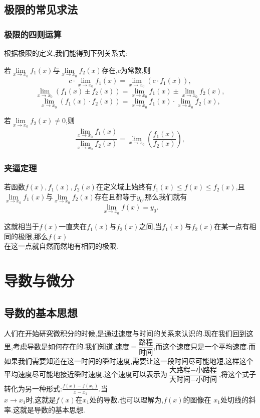 \documentclass{article}
\begin{document}
\subsection{极限的常见求法}
\subsubsection{极限的四则运算}
根据极限的定义,我们能得到下列关系式:
\par 若$\lim\limits_{x\to x_0}f_1(x)$与$\lim\limits_{x\to x_0}f_2(x)$存在,$c$为常数,则
\[c\cdot \lim\limits_{x\to x_0}f_1(x)=\lim\limits_{x\to x_0}\left(c\cdot f_1(x)\right),\]
\[\lim\limits_{x\to x_0}\left(f_1(x)\pm f_2(x) \right)=\lim\limits_{x\to x_0}f_1(x)\pm \lim\limits_{x\to x_0}f_2(x),\]
\[\lim\limits_{x\to x_0}\left(f_1(x)\cdot f_2(x)\right)=\lim\limits_{x\to x_0}f_1(x)\cdot \lim\limits_{x\to x_0}f_2(x),\]
\par 若$\lim\limits_{x\to x_0}f_2(x)\neq 0$,则
\[\frac{\lim\limits_{x\to x_0}f_1(x)}{\lim\limits_{x\to x_0}f_2(x)}=\lim\limits_{x\to x_0}\left(\frac{f_1(x)}{f_2(x)}\right),\]

\subsubsection{夹逼定理}
若函数$f(x),f_1(x),f_2(x)$在定义域上始终有$f_1(x)\le f(x)\le f_2(x)$,且$\lim\limits_{x\to x_0}f_1(x)$与$\lim\limits_{x\to x_0}f_2(x)$存在且都等于$y_0$,那么我们就有
\[\lim\limits_{x\to x_0}f(x)=y_0.\]
\par 这就相当于$f(x)$一直夹在$f_1(x)$与$f_2(x)$之间,当$f_1(x)$与$f_2(x)$在某一点有相同的极限,那么$f(x)$\\在这一点就自然而然地有相同的极限.
\newpage
\section{导数与微分}
\subsection{导数的基本思想}
{人们在开始研究微积分的时候,是通过速度与时间的关系来认识的.现在我们回到这里,考虑导数是如何存在的.我们知道,$\text{速度}=\dfrac{\text{路程}}{\text{时间}}$,而这个速度只是一个平均速度.而如果我们需要知道在这一时间的瞬时速度,需要让这一段时间尽可能地短,这样这个平均速度尽可能地接近瞬时速度.这个速度可以表示为$\dfrac{\text{大路程}-\text{小路程}}{\text{大时间}-\text{小时间}}$,将这个式子转化为另一种形式:$\frac{f(x)-f(x_1)}{x-x_1}$.当\\$x\to x_1$时,这就是$f(x)$在$x_1$处的导数.也可以理解为,$f(x)$的图像在 $x_1$处切线的斜率.这就是导数的基本思想.}
\end{document}
